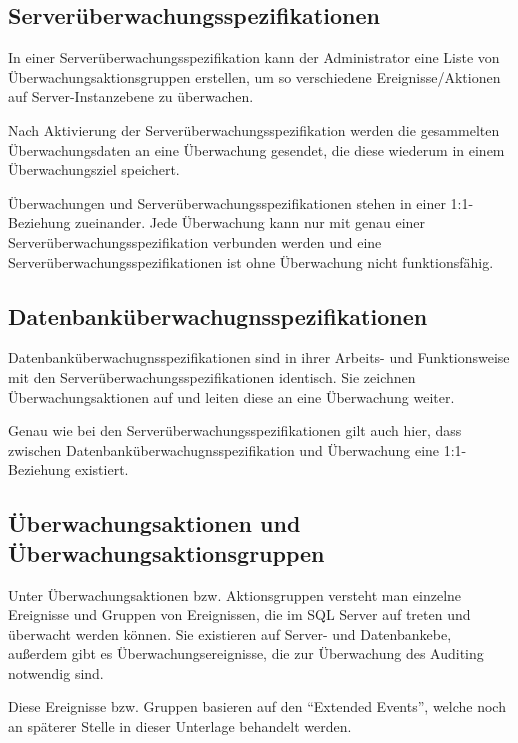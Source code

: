       \subsection{Serverüberwachungsspezifikationen}
        In einer Serverüberwachungsspezifikation kann der Administrator
        eine Liste von Überwachungsaktionsgruppen erstellen, um so
        verschiedene Ereignisse/Aktionen auf Server-Instanzebene zu
        überwachen.
        
        Nach Aktivierung der Serverüberwachungsspezifikation werden die
        gesammelten Überwachungsdaten an eine Überwachung gesendet, die diese
        wiederum in einem Überwachungsziel speichert.
        \begin{merke}
          Überwachungen und Serverüberwachungsspezifikationen stehen in einer
          1:1-Beziehung zueinander. Jede Überwachung kann nur mit genau einer
          Serverüberwachungsspezifikation verbunden werden und eine
          Serverüberwachungsspezifikationen ist ohne Überwachung nicht
          funktionsfähig.
        \end{merke}
      \subsection{Datenbanküberwachugnsspezifikationen}
        Datenbanküberwachugnsspezifikationen sind in ihrer Arbeits- und
        Funktionsweise mit den Serverüberwachungsspezifikationen identisch.
        Sie zeichnen Überwachungsaktionen auf und leiten diese an eine
        Überwachung weiter.
        \begin{merke}
          Genau wie bei den Serverüberwachungsspezifikationen gilt auch hier,
          dass zwischen Datenbanküberwachugnsspezifikation und Überwachung
          eine 1:1-Beziehung existiert.
        \end{merke}
      \subsection{Überwachungsaktionen und Überwachungsaktionsgruppen}
        Unter Überwachungsaktionen bzw. Aktionsgruppen versteht man einzelne
        Ereignisse und Gruppen von Ereignissen, die im SQL Server auf treten
        und überwacht werden können. Sie existieren auf Server- und
        Datenbankebe, außerdem gibt es Überwachungsereignisse, die zur
        Überwachung des Auditing notwendig sind.
        \begin{merke}
          Diese Ereignisse bzw. Gruppen basieren auf den \enquote{Extended
          Events}, welche noch an späterer Stelle in dieser Unterlage behandelt
          werden.
        \end{merke}
        \begin{literaturinternet}
          \item \cite{cc280663}
        \end{literaturinternet}

